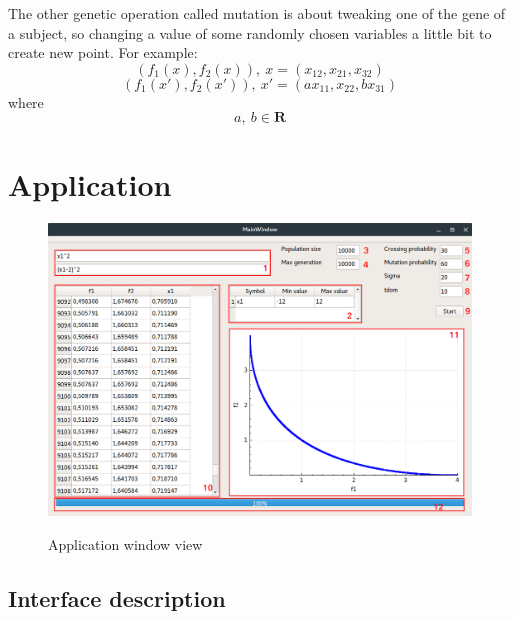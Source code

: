 \documentclass[a4paper, 11pt]{article}
\begin{document}
	The other genetic operation called mutation is about tweaking one of the gene of
	a subject, so changing a value of some randomly chosen variables a little bit to 
	create new point. For example:
	$$(f_{1}(x), f_{2}(x)),\ x=(x_{12}, x_{21}, x_{32})$$
	$$(f_{1}(x'), f_{2}(x')),\ x'=(ax_{11}, x_{22}, bx_{31})$$
	where
	$$a,\ b\in \boldsymbol{R}$$
	
	\newpage	
	\section{Application}
	\begin{figure}[H]
	\centering
	\includegraphics[scale=0.35]{application}
	\label{fig:app_window}
	\caption{Application window view}
	\end{figure}
	
	\subsection{Interface description}	
	
\end{document}
